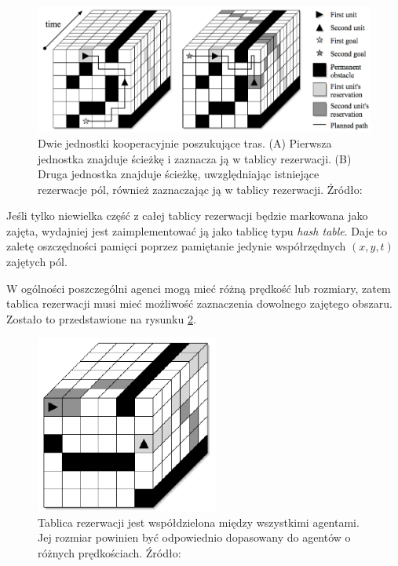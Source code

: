 \begin{figure}[H]
	\centering
	\includegraphics[width=13cm]{img/reservation-table}
	\caption{Dwie jednostki kooperacyjnie poszukujące tras. (A) Pierwsza jednostka znajduje ścieżkę i zaznacza ją w tablicy rezerwacji. (B) Druga jednostka znajduje ścieżkę, uwzględniając istniejące rezerwacje pól, również zaznaczając ją w tablicy rezerwacji. Źródło: \cite{cooppath}}
	\label{fig:img_reservation-table}
\end{figure}

Jeśli tylko niewielka część z całej tablicy rezerwacji będzie markowana jako zajęta, wydajniej jest zaimplementować ją jako tablicę typu {\it hash table}. Daje to zaletę oszczędności pamięci poprzez pamiętanie jedynie współrzędnych $(x, y, t)$ zajętych pól.

W ogólności poszczególni agenci mogą mieć różną prędkość lub rozmiary, zatem tablica rezerwacji musi mieć możliwość zaznaczenia dowolnego zajętego obszaru. Zostało to przedstawione na rysunku \ref{fig:img_reservation-table-3}.

\begin{figure}[H]
	\centering
	\includegraphics[width=6cm]{img/reservation-table-3}
	\caption{Tablica rezerwacji jest współdzielona między wszystkimi agentami. Jej rozmiar powinien być odpowiednio dopasowany do agentów o różnych prędkościach. Źródło: \cite{cooppath}}
	\label{fig:img_reservation-table-3}
\end{figure}

